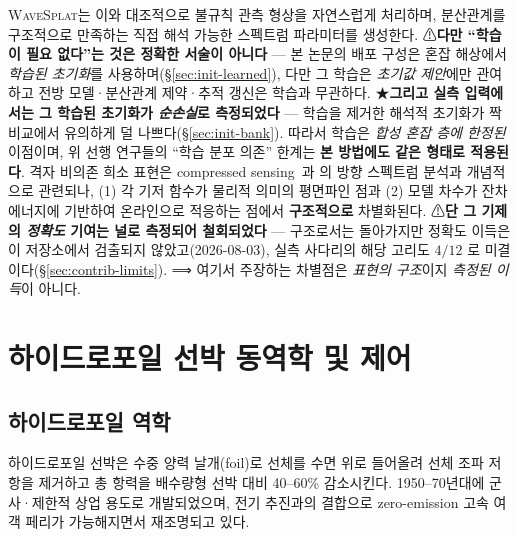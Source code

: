\documentclass[11pt]{report}
\numberwithin{equation}{chapter}
\numberwithin{figure}{chapter}
\numberwithin{table}{chapter}
\newcommand{\WS}{\textsc{WaveSplat}}
\begin{document}
\WS{}는 이와 대조적으로 불규칙 관측 형상을 자연스럽게 처리하며, 분산관계를 구조적으로
만족하는 직접 해석 가능한 스펙트럼 파라미터를 생성한다.
⚠\textbf{다만 ``학습이 필요 없다''는 것은 정확한 서술이 아니다} --- 본 논문의 배포 구성은
혼잡 해상에서 \emph{학습된 초기화}를 사용하며(\S\ref{sec:init-learned}), 다만 그 학습은
\emph{초기값 제안}에만 관여하고 전방 모델·분산관계 제약·추적 갱신은 학습과 무관하다.
★\textbf{그리고 실측 입력에서는 그 학습된 초기화가 \emph{순손실}로 측정되었다} ---
학습을 제거한 해석적 초기화가 짝 비교에서 유의하게 덜 나쁘다(\S\ref{sec:init-bank}).
따라서 학습은 \emph{합성 혼잡 층에 한정된} 이점이며, 위 선행 연구들의 ``학습 분포 의존''
한계는 \textbf{본 방법에도 같은 형태로 적용된다}.
격자 비의존 희소 표현은 compressed sensing~\citep{Candes2006}과
\citet{Donelan1996}의 방향 스펙트럼 분석과 개념적으로 관련되나,
(1) 각 기저 함수가 물리적 의미의 평면파인 점과
(2) 모델 차수가 잔차 에너지에 기반하여 온라인으로 적응하는 점에서 \textbf{구조적으로}
차별화된다.
⚠\textbf{단 그 기제의 \emph{정확도} 기여는 널로 측정되어 철회되었다} ---
구조로서는 돌아가지만 정확도 이득은 이 저장소에서 검출되지 않았고(2026-08-03),
실측 사다리의 해당 고리도 $4/12$ 로 미결이다(\S\ref{sec:contrib-limits}).
⟹ 여기서 주장하는 차별점은 \emph{표현의 구조}이지 \emph{측정된 이득}이 아니다.

\section{하이드로포일 선박 동역학 및 제어}
\label{sec:hydrofoil_control}

\subsection{하이드로포일 역학}

하이드로포일 선박은 수중 양력 날개(foil)로 선체를 수면 위로 들어올려
선체 조파 저항을 제거하고 총 항력을 배수량형 선박 대비 40--60\% 감소시킨다.
1950--70년대에 군사·제한적 상업 용도로 개발되었으며,
전기 추진과의 결합으로 zero-emission 고속 여객 페리가 가능해지면서 재조명되고 있다.
\end{document}
